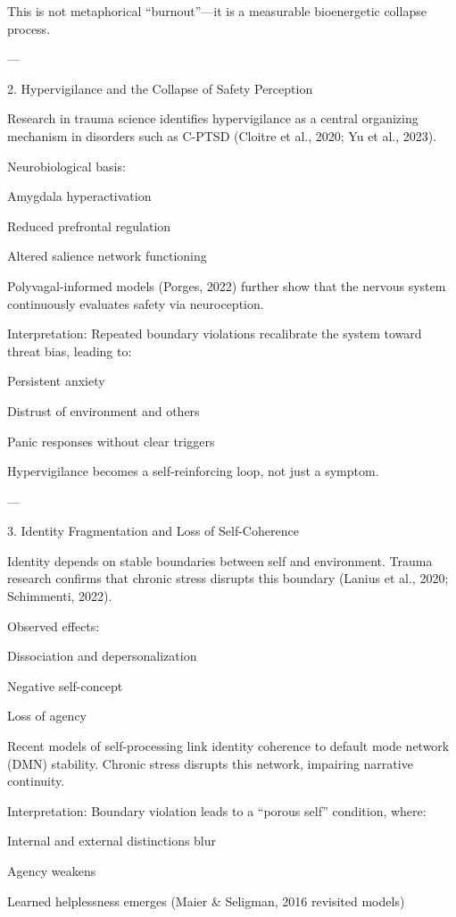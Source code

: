 This is not metaphorical “burnout”—it is a measurable bioenergetic collapse process.


---

2. Hypervigilance and the Collapse of Safety Perception

Research in trauma science identifies hypervigilance as a central organizing mechanism in disorders such as C-PTSD (Cloitre et al., 2020; Yu et al., 2023).

Neurobiological basis:

Amygdala hyperactivation

Reduced prefrontal regulation

Altered salience network functioning


Polyvagal-informed models (Porges, 2022) further show that the nervous system continuously evaluates safety via neuroception.

Interpretation:
Repeated boundary violations recalibrate the system toward threat bias, leading to:

Persistent anxiety

Distrust of environment and others

Panic responses without clear triggers


Hypervigilance becomes a self-reinforcing loop, not just a symptom.


---

3. Identity Fragmentation and Loss of Self-Coherence

Identity depends on stable boundaries between self and environment. Trauma research confirms that chronic stress disrupts this boundary (Lanius et al., 2020; Schimmenti, 2022).

Observed effects:

Dissociation and depersonalization

Negative self-concept

Loss of agency


Recent models of self-processing link identity coherence to default mode network (DMN) stability. Chronic stress disrupts this network, impairing narrative continuity.

Interpretation:
Boundary violation leads to a “porous self” condition, where:

Internal and external distinctions blur

Agency weakens

Learned helplessness emerges (Maier & Seligman, 2016 revisited models)



